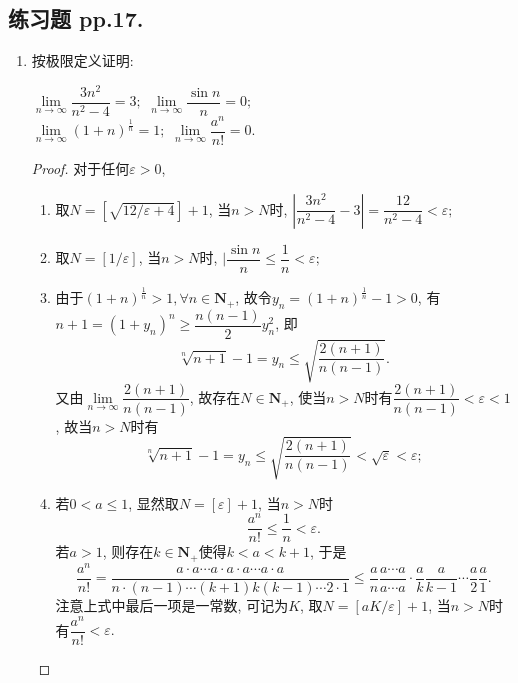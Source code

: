 \documentclass[a4paper,11pt,twoside]{ctexbook}
\begin{document}
\subsection{练习题 pp.17.}
\begin{enumerate}
	\item 按极限定义证明:
	      \begin{tabenum}[(1)]
		      \tabenumitem $\lim\limits_{n\to\infty} \dfrac{3n^2}{n^2-4}=3;$
		      \tabenumitem $\lim\limits_{n\to\infty} \dfrac{\sin{n}}{n}=0;$\\
		      \tabenumitem $\lim\limits_{n\to\infty} (1+n)^{\frac{1}{n}}=1;$
		      \tabenumitem $\lim\limits_{n\to\infty} \dfrac{a^n}{n!}=0.$
	      \end{tabenum}
	      \begin{proof}
		      对于任何$\varepsilon>0$,
		      \begin{enumerate}[(1)]
			      \item 取$N=[\sqrt{12/\varepsilon+4}]+1$, 当$n>N$时, $|\dfrac{3n^2}{n^2-4}-3|=\dfrac{12}{n^2-4}<\varepsilon;$
			      \item 取$N=[1/\varepsilon]$, 当$n>N$时, $|\dfrac{\sin{n}}{n}\leqslant\dfrac{1}{n}<\varepsilon;$
			      \item 由于$(1+n)^{\frac{1}{n}}>1, \forall n\in\mathbf{N}_{+}$, 故令$y_n=(1+n)^{\frac{1}{n}}-1>0$, 有$n+1=(1+y_n)^n\geqslant \dfrac{n(n-1)}{2}y_n^2$, 即
			            \[
				            \sqrt[n]{n+1}-1=y_n\leqslant\sqrt{\dfrac{2(n+1)}{n(n-1)}}.
			            \]
			            又由$\lim\limits_{n\to\infty}\dfrac{2(n+1)}{n(n-1)}$, 故存在$N\in\mathbf{N}_{+}$, 使当$n>N$时有$\dfrac{2(n+1)}{n(n-1)}<\varepsilon<1$, 故当$n>N$时有
			            \[
				            \sqrt[n]{n+1}-1=y_n\leqslant\sqrt{\dfrac{2(n+1)}{n(n-1)}}<\sqrt{\varepsilon}<\varepsilon;
			            \]
			      \item 若$0<a\leqslant 1$, 显然取$N=[\varepsilon]+1$, 当$n>N$时
			            \[
				            \dfrac{a^n}{n!}\leqslant\dfrac{1}{n}<\varepsilon.
			            \]
			            若$a>1$, 则存在$k\in\mathbf{N}_{+}$使得$k<a<k+1$, 于是
			            \[
				            \dfrac{a^n}{n!}=\dfrac{a\cdot a\cdots a\cdot a\cdot a\cdots a\cdot a}{n\cdot(n-1)\cdots(k+1)k(k-1)\cdots2\cdot1}\leqslant\dfrac{a}{n}\dfrac{a\cdots a}{a\cdots a}\cdot\dfrac{a}{k}\dfrac{a}{k-1}\cdots\dfrac{a}{2}\dfrac{a}{1}.
			            \]
			            注意上式中最后一项是一常数, 可记为$K$, 取$N=[aK/\varepsilon]+1$, 当$n>N$时有$\dfrac{a^n}{n!}<\varepsilon.$\qedhere
		      \end{enumerate}
	      \end{proof}

\end{enumerate}
\end{document}
